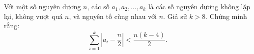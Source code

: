 \ifshowproblem
\begin{problem}\label{example:KOR-2015-MO-P8}
    Với một số nguyên dương \( n \), các số \( a_1, a_2, \ldots, a_k \) là các số nguyên dương không lặp lại, không vượt quá \( n \), 
    và nguyên tố cùng nhau với \( n \). Giả sử \( k > 8 \).  
    Chứng minh rằng:
    \[
        \sum_{i=1}^k \left| a_i - \frac{n}{2} \right| < \frac{n(k - 4)}{2}.
    \]
\end{problem}
\fi

\footnotemark
{}
\fi